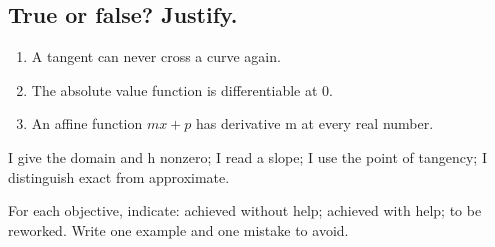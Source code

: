 \subsection*{True or false? Justify.}\label{C04-VF}
\begin{enumerate}
\item A tangent can never cross a curve again.
\item The absolute value function is differentiable at 0.
\item An affine function $mx+p$ has derivative m at every real number.
\end{enumerate}
\begin{keypoint}I give the domain and h nonzero; I read a slope; I use the point of tangency; I distinguish exact from approximate.

For each objective, indicate: achieved without help; achieved with help; to be reworked. Write one example and one mistake to avoid.\end{keypoint}
\endgroup
\ifmxteacher{}\fi
